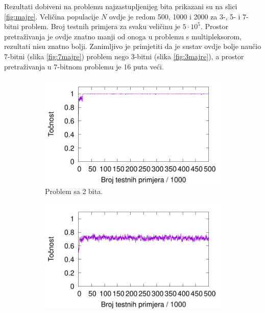 \documentclass[times, utf8, zavrsni]{fer}
\begin{document}
Rezultati dobiveni na problemu najzastupljenijeg bita prikazani su na slici \ref{fig:majre}.
Veličina populacije $N$ ovdje je redom 500, 1000 i 2000 za 3-, 5- i 7-bitni problem.
Broj testnih primjera za svaku veličinu je $5 \cdot 10^{5}$.
Prostor pretraživanja je ovdje znatno manji od onoga u problemu s multipleksorom, rezultati nisu znatno bolji.
Zanimljivo je primjetiti da je sustav ovdje bolje naučio 7-bitni (slika \ref{fig:7majre}) problem nego 3-bitni (slika \ref{fig:3majre}), a prostor pretraživanja u 7-bitnom problemu je 16 puta veći.

\begin{figure}
    \centering
    \begin{subfigure}{0.496\textwidth}
        \centering
        \includegraphics[width=\textwidth]{img/parity/2pare.pdf}
        \caption{Problem sa 2 bita.}
        \label{fig:2pare}
    \end{subfigure}
    \begin{subfigure}{0.496\textwidth}
        \centering
        \includegraphics[width=\textwidth]{img/parity/3pare.pdf}

\end{subfigure}
\end{figure}
\end{document}
